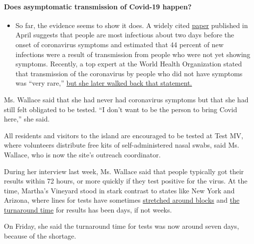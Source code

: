 \begin{itemize}
{  \paragraph{Does asymptomatic transmission of Covid-19
  happen?}\label{does-asymptomatic-transmission-of-covid-19-happen}}

  \begin{itemize}
  \tightlist
  \item
    So far, the evidence seems to show it does. A widely cited
    \href{https://www.nature.com/articles/s41591-020-0869-5}{paper}
    published in April suggests that people are most infectious about
    two days before the onset of coronavirus symptoms and estimated that
    44 percent of new infections were a result of transmission from
    people who were not yet showing symptoms. Recently, a top expert at
    the World Health Organization stated that transmission of the
    coronavirus by people who did not have symptoms was ``very rare,''
    \href{https://www.nytimes3xbfgragh.onion/2020/06/09/world/coronavirus-updates.html?action=click\&pgtype=Article\&state=default\&region=MAIN_CONTENT_3\&context=storylines_faq\#link-1f302e21}{but
    she later walked back that statement.}
  \end{itemize}
\end{itemize}

Ms. Wallace said that she had never had coronavirus symptoms but that
she had still felt obligated to be tested. ``I don't want to be the
person to bring Covid here,'' she said.

All residents and visitors to the island are encouraged to be tested at
Test MV, where volunteers distribute free kits of self-administered
nasal swabs, said Ms. Wallace, who is now the site's outreach
coordinator.

During her interview last week, Ms. Wallace said that people typically
got their results within 72 hours, or more quickly if they test positive
for the virus. At the time, Martha's Vineyard stood in stark contrast to
states like New York and Arizona, where lines for tests have sometimes
\href{https://www.nytimes3xbfgragh.onion/2020/07/06/us/coronavirus-test-shortage.html}{stretched
around blocks} and
\href{https://www.azcentral.com/story/news/local/arizona-health/2020/07/06/slow-covid-19-test-results-have-cascade-effect-public-health/5386582002/}{the
turnaround time} for results has been days, if not weeks.

On Friday, she said the turnaround time for tests was now around seven
days, because of the shortage.

